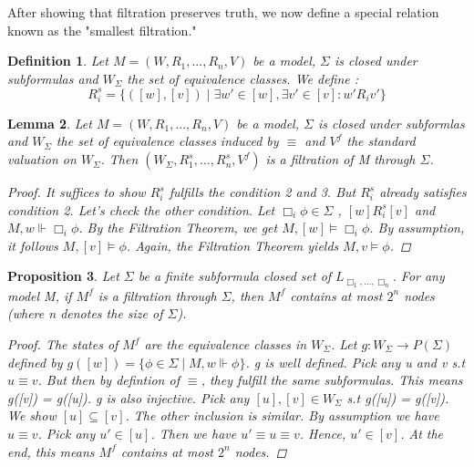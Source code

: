 \documentclass[12pt, a4paper]{scrartcl}
\newtheorem{definition}{Definition}[subsection]
\newtheorem{lemma}[definition]{Lemma}
\newtheorem{proposition}[definition]{Proposition}
\begin{document}
After showing that filtration preserves truth, we now define a special relation known as the "smallest filtration."

\begin{definition}
    Let $M = (W,R_1,...,R_n,V)$ be a model, $\Sigma$ is closed under subformulas and $W_\Sigma$ the set of equivalence classes. We define :
    $$R^s_i = \{([w],[v]) \mid \exists w' \in [w], \exists v' \in [v] : w'R_i v'\}$$ 
\end{definition}

\begin{lemma}
    Let $M = (W,R_1,...,R_n,V)$ be a model, $\Sigma$ is closed under subformlas and $W_\Sigma$ the set of equivalence classes induced by $\equiv$ and $V^f$ the standard valuation on $W_\Sigma$. Then $(W_\Sigma, R_1^s,...,R_n^s,V^f)$ is 
    a filtration of M through $\Sigma$.
    \begin{proof}
    
    It suffices to show $R^s_i$ fulfills the condition 2 and 3. But $R^s_i$ already satisfies condition 2.
    Let's check the other condition. Let $\Box_i \phi \in \Sigma$ , $[w]R^s_i[v]$ and $M,w \Vdash \Box_i \phi$. By the Filtration Theorem, we get 
    $M,[w] \vDash \Box_i \phi$. By assumption, it follows $M,[v] \vDash \phi$. Again, the Filtration Theorem yields $M,v \vDash \phi$.
    
    \end{proof}    
\end{lemma}

\begin{proposition}
    Let $\Sigma$ be a finite subformula closed set of $L_{\Box_1,...,\Box_n}$. For any model M, if $M^f$ is a filtration through $\Sigma$, then $M^f$ contains at most $2^n$ nodes (where n denotes the size of $\Sigma$).

    \begin{proof}
    The states of $M^f$ are the equivalence classes in $W_\Sigma$. Let $g : W_\Sigma \rightarrow P(\Sigma)$ defined by $g([w]) = \{ \phi \in \Sigma \mid M,w \Vdash \phi\}$.
    g is well defined. Pick any u and v s.t $u\equiv v$. But then by defintion of $\equiv$, they fulfill the same subformulas. This means g([v]) = g([u]). \newline
    g is also injective. Pick any $[u],[v] \in W_\Sigma$ s.t g([u]) = g([v]). We show $[u]\subseteq[v]$. The other inclusion is similar.
    By assumption we have $u \equiv v$. Pick any $u' \in [u]$. Then we have $u' \equiv u \equiv v$. Hence, $u' \in [v]$. At the end, this means $M^f$ contains at most $2^n$ nodes.

    \end{proof}     
\end{proposition}
\end{document}
